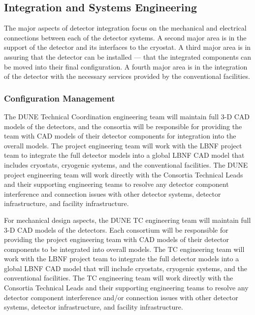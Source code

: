 \subsection{Integration and Systems Engineering }
\label{sec:fdsp-coord-integ-sysengr}

The major aspects of detector integration focus on the mechanical and
electrical connections between each of the detector systems. A second
major area is in the support of the detector and its interfaces to the
cryostat. A third major area is in assuring that the detector can be
installed --- that the integrated components can be moved into their
final configuration. A fourth major area is in the integration of the
detector with the necessary services provided by the conventional
facilities.

\subsubsection{Configuration Management}
\label{sec:fdsp-coord-integ-config}

The DUNE Technical Coordination engineering team will maintain
full 3-D CAD models of the detectors, and the consortia will be
responsible for providing the team with CAD models of their detector
components for integration into the overall models.  The project
engineering team will work with the LBNF project team to integrate the
full detector models into a global LBNF CAD model that includes
cryostats, cryogenic systems, and the conventional facilities.  The
DUNE project engineering team will work directly with the Consortia
Technical Leads and their supporting engineering teams to resolve any
detector component interference and connection issues with other
detector systems, detector infrastructure, and facility
infrastructure.

For mechanical design aspects, the DUNE TC 
engineering team will maintain full 3-D CAD models of the detectors.
Each consortium will be responsible for providing the project
engineering team with CAD models of their detector components to be
integrated into overall models.  The TC engineering team will
work with the LBNF project team to integrate the full detector models
into a global LBNF CAD model that will include cryostats, cryogenic
systems, and the conventional facilities.  The TC
engineering team will work directly with the Consortia Technical Leads
and their supporting engineering teams to resolve any detector
component interference and/or connection issues with other detector
systems, detector infrastructure, and facility infrastructure.

